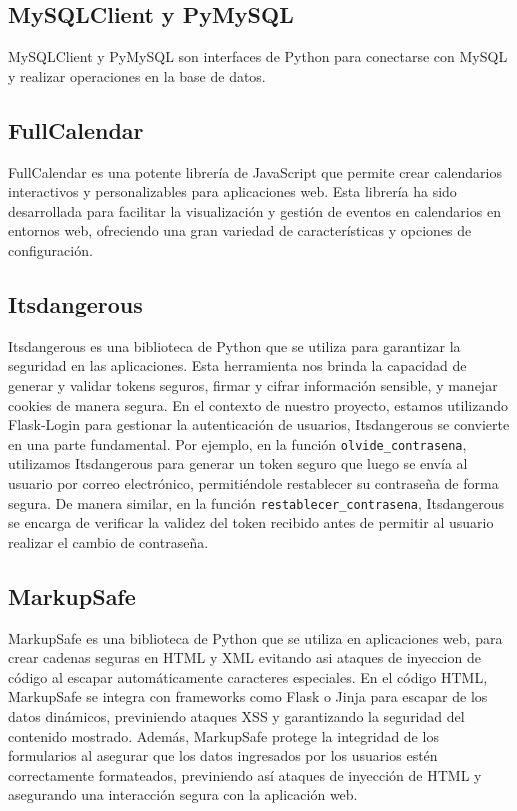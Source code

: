 \documentclass[a4paper, 12pt]{book}
\begin{document}
\subsection{MySQLClient y PyMySQL} 
\label{subsec:pymysql} 
MySQLClient y PyMySQL son interfaces de Python para conectarse con MySQL y realizar operaciones en la base de datos.
\subsection{FullCalendar}
\label{subsec:fullcalendar}
FullCalendar es una potente librería de JavaScript que permite crear calendarios interactivos y personalizables para aplicaciones web. 
Esta librería ha sido desarrollada para facilitar la visualización y gestión de eventos en calendarios en entornos web, ofreciendo una 
gran variedad de características y opciones de configuración.

\subsection{Itsdangerous} 
\label{subsec:itsdangerous} 
Itsdangerous es una biblioteca de Python que se utiliza para garantizar la seguridad en las aplicaciones. Esta herramienta nos brinda 
la capacidad de generar y validar tokens seguros, firmar y cifrar información sensible, y manejar cookies de manera segura. 
En el contexto de nuestro proyecto, estamos utilizando Flask-Login para gestionar la autenticación de usuarios, Itsdangerous se 
convierte en una parte fundamental. Por ejemplo, en la función \texttt{olvide\_contrasena}, utilizamos Itsdangerous para generar un token 
seguro que luego se envía al usuario por correo electrónico, permitiéndole restablecer su contraseña de forma segura. De manera 
similar, en la función \texttt{restablecer\_contrasena}, Itsdangerous se encarga de verificar la validez del token recibido antes de permitir 
al usuario realizar el cambio de contraseña.

\subsection{MarkupSafe} 
\label{subsec:markupsafe} 
MarkupSafe es una biblioteca de Python que se utiliza en aplicaciones web, para crear cadenas seguras en HTML y XML evitando asi ataques de inyeccion de código 
al escapar automáticamente caracteres especiales. En el código HTML, MarkupSafe se integra con frameworks como Flask o Jinja para escapar de los datos dinámicos, 
previniendo ataques XSS y garantizando la seguridad del contenido mostrado. Además, MarkupSafe protege la integridad de los formularios al asegurar que los datos 
ingresados por los usuarios estén correctamente formateados, previniendo así ataques de inyección de HTML y asegurando una interacción segura con la aplicación web. 
\end{document}
